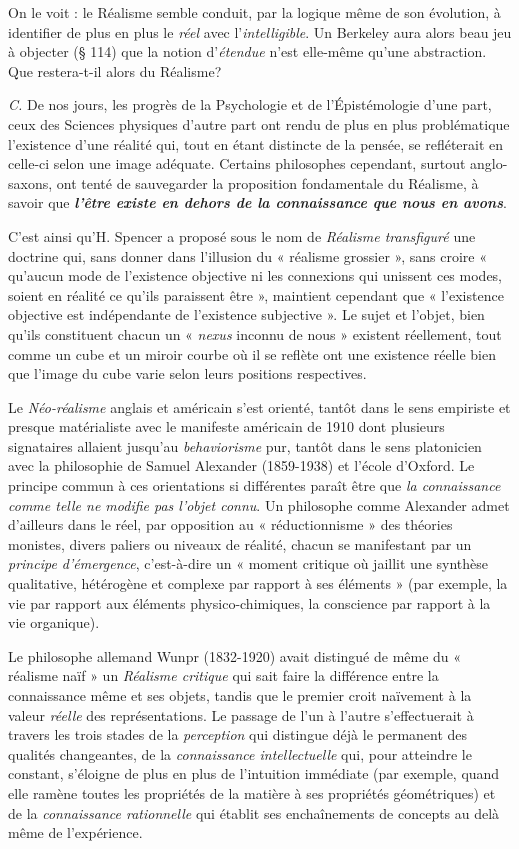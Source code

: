 On le voit : le Réalisme semble conduit, par la logique même de
son évolution, à identifier de plus en plus le {\it réel} avec l’{\it intelligible}.
Un Berkeley aura alors beau jeu à objecter (§ 114) que la notion
d’{\it étendue} n’est elle-même qu’une abstraction. Que restera-t-il alors
du Réalisme?

{\it C.} De nos jours, les progrès de la Psychologie et de l’Épistémologie
d’une part, ceux des Sciences physiques d’autre part ont rendu de
plus en plus problématique l’existence d’une réalité qui, tout en étant
distincte de la pensée, se refléterait en celle-ci selon une image adéquate.
Certains philosophes cependant, surtout anglo-saxons, ont
tenté de sauvegarder la proposition fondamentale du Réalisme, à
savoir que \textbf{\textit {l'être existe en dehors de la connaissance que nous en
avons}}.

C'est ainsi qu'H. Spencer a proposé sous le nom de \textsf{\textit {Réalisme transfiguré}}
une doctrine qui, sans donner dans l'illusion du « réalisme grossier », sans
croire « qu'aucun mode de l'existence objective ni les connexions qui unissent
ces modes, soient en réalité ce qu'ils paraissent être », maintient cependant
que « l'existence objective est indépendante de l'existence subjective ».
Le sujet et l’objet, bien qu'ils constituent chacun un « {\it nexus} inconnu de
nous » existent réellement, tout comme un cube et un miroir courbe où
il se reflète ont une existence réelle bien que l’image du cube varie selon leurs
positions respectives.

Le \textsf{\textit {Néo-réalisme}} anglais et américain s’est orienté, tantôt dans le sens
empiriste et presque matérialiste avec le manifeste américain de 1910 dont
plusieurs signataires allaient jusqu’au {\it behaviorisme} pur, tantôt dans le sens
platonicien avec la philosophie de Samuel Alexander (1859-1938) et l'école
d'Oxford. Le principe commun à ces orientations si différentes paraît être
que \textsf{\textit {la connaissance comme telle ne modifie pas l'objet connu}}. Un philosophe
comme Alexander admet d’ailleurs dans le réel, par opposition au « réductionnisme »
des théories monistes, divers paliers ou niveaux de réalité,
chacun se manifestant par un {\it principe d'émergence}, c'est-à-dire un « moment
critique où jaillit une synthèse qualitative, hétérogène et complexe par
rapport à ses éléments » (par exemple, la vie par rapport aux éléments
physico-chimiques, la conscience par rapport à la vie organique).

Le philosophe allemand Wunpr (1832-1920) avait distingué de même du
« réalisme naïf » un \textsf{\textit {Réalisme critique}} qui sait faire la différence entre la connaissance
même et ses objets, tandis que le premier croit naïvement à la valeur
{\it réelle} des représentations. Le passage de l’un à l’autre s'effectuerait à travers
les trois stades de la {\it perception} qui distingue déjà le permanent des qualités
changeantes, de la {\it connaissance intellectuelle} qui, pour atteindre le constant,
s'éloigne de plus en plus de l'intuition immédiate (par exemple, quand elle
ramène toutes les propriétés de la matière à ses propriétés géométriques) et
de la {\it connaissance rationnelle} qui établit ses enchaînements de concepts
au delà même de l'expérience.

